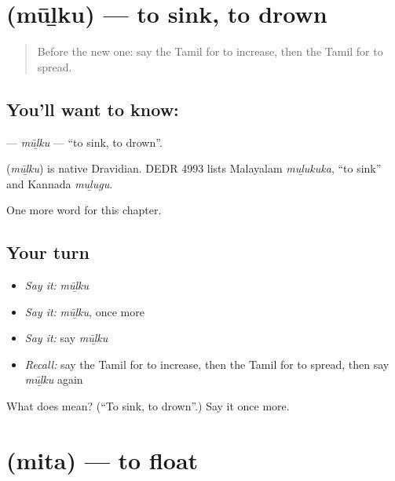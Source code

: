 \section[\texorpdfstring{\ta{மூழ்கு} (mūḻku)}{மூழ்கு (mūḻku)}]{ (mūḻku) — to sink, to drown}

\label{lesson:TA-C260-mulku}



\begin{quote}
Before the new one: say the Tamil for to increase, then the Tamil for to spread.
\end{quote}

\subsection*{You'll want to know: }
\textbf{} — \emph{mūḻku} — \textquotedblleft{}to sink, to drown\textquotedblright{}.

\begin{cousinweb}
\textbf{} (\emph{mūḻku}) is native Dravidian. DEDR 4993 lists Malayalam \emph{muḻukuka}, \textquotedblleft{}to sink\textquotedblright{} and Kannada \emph{muḻugu}.
\end{cousinweb}

\begin{grammarlens}[title={What you've built}]
One more word for this chapter.
\end{grammarlens}

\subsection*{Your turn}
\begin{itemize}
\raggedright
  \item \emph{Say it:} \emph{mūḻku}
  \item \emph{Say it:} \emph{mūḻku}, once more
  \item \emph{Say it:} say \emph{mūḻku}
  \item \emph{Recall:} say the Tamil for to increase, then the Tamil for to spread, then say \emph{mūḻku} again
\end{itemize}

\begin{tcolorbox}[breakable,colback=teal!4,colframe=teal!35!black,title={Before you move on}]
What does  mean? (\textquotedblleft{}To sink, to drown\textquotedblright{}.) Say it once more.
\end{tcolorbox}
\section[\texorpdfstring{\ta{மித} (mita)}{மித (mita)}]{ (mita) — to float}

